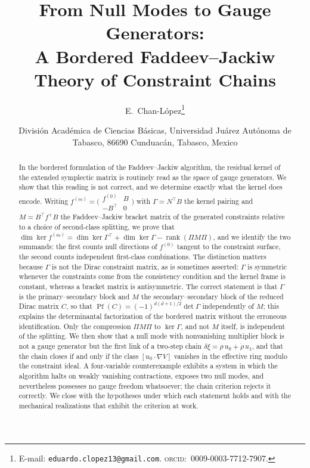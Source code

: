 \documentclass[12pt]{article}
\title{From Null Modes to Gauge Generators:\\
	A Bordered Faddeev--Jackiw Theory of Constraint Chains}
\author{%
	E.~Chan-L\'opez\thanks{%
		E-mail: \texttt{eduardo.clopez13@gmail.com}.\;
		\textsc{orcid}:~0009-0003-7712-7907.}}
\date{%
	Divisi\'on Acad\'emica de Ciencias B\'asicas,
	Universidad Ju\'arez Aut\'onoma de Tabasco, 86690 Cunduac\'an,
	Tabasco, Mexico}
\theoremstyle{plain}
\theoremstyle{definition}
\theoremstyle{remark}
\DeclareMathOperator{\rank}{rank}
\DeclareMathOperator{\Pf}{Pf}
\begin{document}
	\maketitle
	
	\begin{abstract}
		In the bordered formulation of the Faddeev--Jackiw algorithm, the residual
		kernel of the extended symplectic matrix is routinely read as the space of
		gauge generators. We show that this reading is not correct, and we determine
		exactly what the kernel does encode. Writing
		$f^{(m)}=\bigl(\begin{smallmatrix}f^{(0)}&B\\-B^{\top}&0\end{smallmatrix}\bigr)$
		with $\Gamma=N^{\top}B$ the kernel pairing and $M=B^{\top}f^{+}B$ the
		Faddeev--Jackiw bracket matrix of the generated constraints relative to a choice
		of second-class splitting, we prove that
		$\dim\ker f^{(m)}=\dim\ker\Gamma^{\top}+\dim\ker\Gamma-\rank(\Pi M\Pi)$, and we
		identify the two summands: the first counts null directions of $f^{(0)}$
		tangent to the constraint surface, the second counts independent first-class
		combinations. The distinction matters because $\Gamma$ is not the Dirac
		constraint matrix, as is sometimes asserted: $\Gamma$ is symmetric whenever the
		constraints come from the consistency condition and the kernel frame is
		constant, whereas a bracket matrix is antisymmetric. The correct statement is
		that $\Gamma$ is the primary--secondary block and $M$ the secondary--secondary
		block of the reduced Dirac matrix $C$, so that
		$\Pf(C)=(-1)^{d(d+1)/2}\det\Gamma$ independently of $M$; this explains the
		determinantal factorization of the bordered matrix without the erroneous
		identification. Only the compression $\Pi M\Pi$ to $\ker\Gamma$, and not $M$
		itself, is independent of the splitting. We then show that a null mode with nonvanishing multiplier block
		is not a gauge generator but the first link of a two-step chain
		$\delta\xi=\rho\,u_{0}+\dot\rho\,u_{1}$, and that the chain closes if and only if
		the class $[u_{0}\cdot\nabla V]$ vanishes in the effective ring modulo the
		constraint ideal. A four-variable counterexample exhibits a system in which the
		algorithm halts on weakly vanishing contractions, exposes two null modes, and
		nevertheless possesses no gauge freedom whatsoever; the chain criterion rejects
		it correctly. We close with the hypotheses under which each statement holds and
		with the mechanical realizations that exhibit the criterion at work.
	\end{abstract}
	
\end{document}
